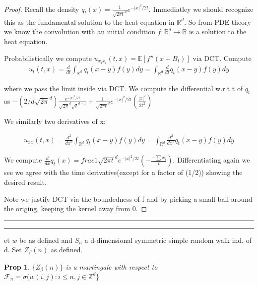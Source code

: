 \documentclass[11pt]{article}
\newcommand{\Z}{\mathbb{Z}}
\newcommand{\R}{\mathbb{R}}
\newcommand{\E}{\mathbb{E}}
\newcommand{\question}[2] {\vspace{.25in} \hrule\vspace{0.5em}
\noindent{\bf #1: #2} \vspace{0.5em}
\hrule \vspace{.10in}}
\newtheorem{prop}{Prop}
\begin{document}
\begin{proof}
	Recall the density $q_t(x) = \frac{1}{\sqrt{2\pi t}^d} e^{-|x|^2/2t}$. Immediatley we should recognize this as the fundamental solution to the heat equation in $\R^d$. So from PDE theory we know the convolution with an initial condition $f: \R^d \to \R$ is a solution to the heat equation.

	Probabilistically we compute $u_{x_ix_i}(t,x) = \E[f''(x+B_t)]$ via DCT. Compute
	\begin{align*}
		u_t(t,x) = \frac{d}{dt}\int_{\R^d} q_t(x-y)f(y)dy = \int_{\R^d} \frac{d}{dt}q_t(x-y)f(y)dy
	\end{align*}

	where we pass the limit inside via DCT. We compute the differential w.r.t t of $q_t$ as $-(2/d\sqrt{2\pi}^d)\frac{e^{-|x|^2/2t}}{\sqrt{2\pi}^d \sqrt{t}^{d+1}} + \frac{1}{\sqrt{2\pi t}^d}e^{-|x|^2/2t}(\frac{|x|^2}{2t^2})$

	We similarly two derivatives of x:

	\begin{align*}
		u_{xx}(t,x) = \frac{d^2}{dx^2}\int_{\R^d} q_t(x-y)f(y)dy = \int_{\R^d} \frac{d^2}{dx^2}q_t(x-y)f(y)dy
	\end{align*}

	We compute $\frac{d}{dx}q_t(x) = frac{1}{\sqrt{2\pi t}^d} e^{-|x|^2/2t}(-\frac{-\sum x_i}{t})$. Differentiating again we see we agree with the time derivative(except for a factor of (1/2)) showing the desired result.

	Note we justify DCT via the boundedness of f and by picking a small ball around the origing, keeping the kernel away from 0. 
\end{proof}

\question{Question 15}

Let $w$ be as defined and $S_n$ a d-dimensional symmetric simple random walk ind. of d. Set $Z_{\beta}(n)$ as defined.

\begin{prop}
	$\{Z_{\beta}(n)\}$ is a martingale with respect to $\mathcal{F}_n = \sigma(w(i,j): i \leq n, j \in \Z^d\}$
\end{prop}
\end{document}
